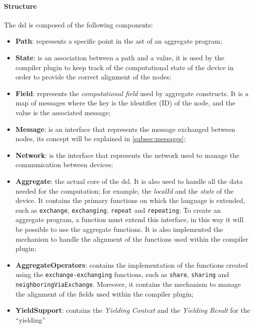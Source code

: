 
\paragraph{Structure}
The \ac{dsl} is composed of the following components:
\begin{itemize}
    \item \textbf{Path}: represents a specific point in the \ac{ast} of an aggregate program;
    \item \textbf{State}: is an association between a path and a value, it is used by the compiler plugin to
        keep track of the computational state of the device in order to provide the correct alignment of the nodes;
    \item \textbf{Field}: represents the \emph{computational field} used by aggregate constructs.
        It is a map of messages where the key is the identifier (ID) of the node, and the value is the associated message;
    \item \textbf{Message}: is an interface that represents the message exchanged between nodes, its concept will be explained in \ref{subsec:messages};
    \item \textbf{Network}: is the interface that represents the network used to manage the communication between devices;
    \item \textbf{Aggregate}: the actual core of the \ac{dsl}.
        It is also used to handle all the data needed for the computation; for example, the \emph{localId} and the \emph{state} of the device.
        It contains the primary functions on which the language is extended, such as \texttt{exchange}, \texttt{exchanging}, \texttt{repeat} and \texttt{repeating};
        To create an aggregate program, a function must extend this interface, in this way it will be possible to use the aggregate functions.
        It is also implemented the mechanism to handle the alignment of the functions used within the compiler plugin;
    \item \textbf{AggregateOperators}: contains the implementation of the functions created using the \texttt{exchange-exchanging} functions,
        such as \texttt{share}, \texttt{sharing} and \texttt{neighboringViaExchange}.
        Moreover, it contains the mechanism to manage the alignment of the fields used within the compiler plugin;
    \item \textbf{YieldSupport}: contains the \emph{Yielding Context} and the \emph{Yielding Result} for the ``yielding''

\end{itemize}
